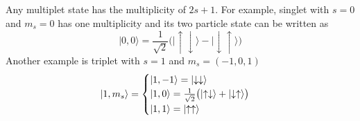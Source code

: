 \documentclass[../../../main.tex]{subfiles}
\begin{document}
Any multiplet state has the multiplicity of $2s+1$.
For example, singlet with $s=0$ and $m_s=0$ has one multiplicity and its two particle state can be written as 
\begin{equation*}
    \lvert 0,0\rangle = \frac{1}{\sqrt{2}}\bigl(\lvert\uparrow\downarrow\rangle - \lvert\downarrow\uparrow\rangle\bigr)
\end{equation*}
Another example is triplet with $s=1$ and $m_s=(-1,0,1)$
\begin{equation*}
    \ket{1,m_s} = 
    \begin{cases}
    \lvert 1,-1\rangle = \lvert\downarrow\downarrow\rangle        \\
    \lvert 1,0\rangle = \frac{1}{\sqrt{2}}\bigl(\lvert\uparrow\downarrow\rangle+\lvert\downarrow\uparrow\rangle\bigr)\\
    \lvert 1,1\rangle = \lvert\uparrow\uparrow\rangle\\
    \end{cases}
\end{equation*}
\end{document}
